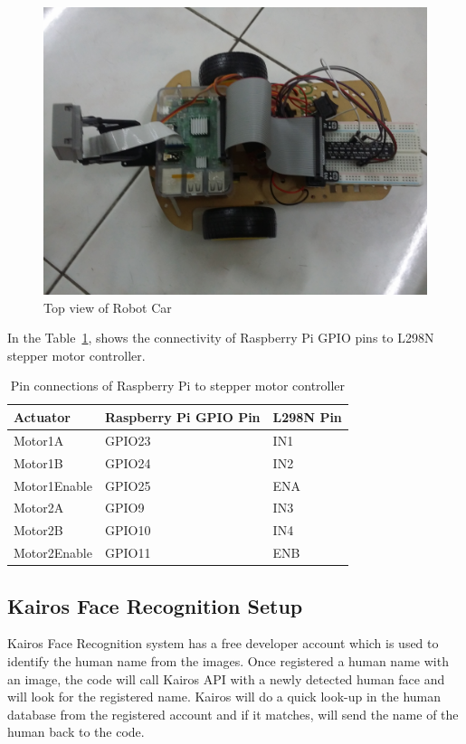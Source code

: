 \begin{figure}[htb]
  \includegraphics[width=0.8\columnwidth]{images/RobotCar_TopView.jpg}
  \caption{Top view of Robot Car}\label{F:robottop}
\end{figure}


In the Table~\ref{T:pinlayout}, shows the connectivity of Raspberry Pi GPIO 
pins to L298N stepper motor controller.

\begin{table}[htb]
\caption{Pin connections of Raspberry Pi to stepper motor 
controller}\label{T:pinlayout}
\begin{tabular}{lll}
Actuator & Raspberry Pi GPIO Pin & L298N Pin \\
\hline
    Motor1A & GPIO23 & IN1 \\
    Motor1B & GPIO24 & IN2 \\
    Motor1Enable & GPIO25 & ENA \\
    Motor2A & GPIO9 & IN3 \\
    Motor2B & GPIO10 & IN4 \\
    Motor2Enable & GPIO11 & ENB \\
\end{tabular}
\end{table}


\subsection{Kairos Face Recognition Setup}
Kairos Face Recognition system has a free developer account which is used 
to identify the human name from the images. Once registered a human name 
with an image, the code will call Kairos API with a newly detected human 
face and will look for the registered name. Kairos will do a quick look-up 
in the human database from the registered account and if it matches, will 
send the name of the human back to the code.


